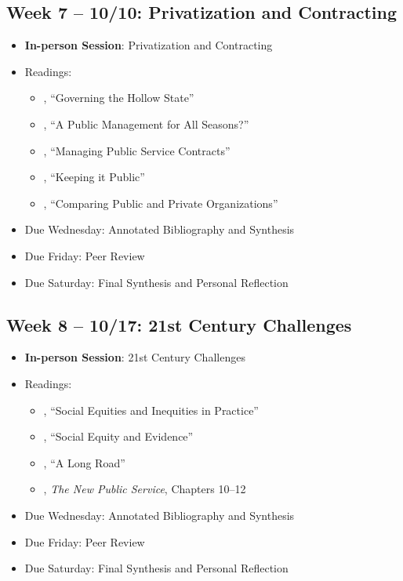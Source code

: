 \documentclass[12pt, letterpaper]{article}
\begin{document}
\subsection*{Week 7 -- 10/10: Privatization and Contracting}
\begin{itemize}
    \item \textbf{In-person Session}: Privatization and Contracting
    \item Readings:
        \begin{itemize}
            \item \citet{MILWARD2000a}, ``Governing the Hollow State''
            \item \cite{hood1991}, ``A Public Management for All Seasons?''
            \item \citet{brown2006}, ``Managing Public Service Contracts''
            \item \citet{jos2009}, ``Keeping it Public''
            \item \citet{rainey2000}, ``Comparing Public and Private Organizations''
        \end{itemize}
        \item Due Wednesday: Annotated Bibliography and Synthesis
        \item Due Friday: Peer Review
        \item Due Saturday: Final Synthesis and Personal Reflection
\end{itemize}

\subsection*{Week 8 -- 10/17: 21st Century Challenges}
\begin{itemize}
    \item \textbf{In-person Session}: 21st Century Challenges
    \item Readings:
        \begin{itemize}
            \item \citet{maynard-moody2012}, ``Social Equities and Inequities in Practice'' 
            \item \citet{GOODEN2017}, ``Social Equity and Evidence'' 
            \item \citet{mccandless2022}, ``A Long Road''
            \item \citet{Denhardt2015}, \emph{The New Public Service}, Chapters 10--12 
        \end{itemize}
        \item Due Wednesday: Annotated Bibliography and Synthesis
        \item Due Friday: Peer Review
        \item Due Saturday: Final Synthesis and Personal Reflection
\end{itemize}
\end{document}
